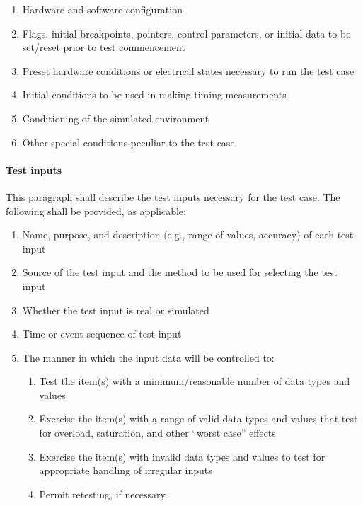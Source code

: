 \begin{enumerate}
\itemsep1pt\parskip0pt
\item
  Hardware and software configuration
\item
  Flags, initial breakpoints, pointers, control parameters, or initial
  data to be set/reset prior to test commencement
\item
  Preset hardware conditions or electrical states necessary to run the
  test case
\item
  Initial conditions to be used in making timing measurements
\item
  Conditioning of the simulated environment
\item
  Other special conditions peculiar to the test case
\end{enumerate}

\paragraph{Test inputs}

This paragraph shall describe the test inputs necessary for the test
case. The following shall be provided, as applicable:

\begin{enumerate}
\itemsep1pt\parskip0pt
\item
  Name, purpose, and description (e.g., range of values, accuracy) of
  each test input
\item
  Source of the test input and the method to be used for selecting the
  test input
\item
  Whether the test input is real or simulated
\item
  Time or event sequence of test input
\item
  The manner in which the input data will be controlled to:

  \begin{enumerate}
  \itemsep1pt\parskip0pt
  \item
    Test the item(s) with a minimum/reasonable number of data types and
    values
  \item
    Exercise the item(s) with a range of valid data types and values
    that test for overload, saturation, and other ``worst case'' effects
  \item
    Exercise the item(s) with invalid data types and values to test for
    appropriate handling of irregular inputs
  \item
    Permit retesting, if necessary
  \end{enumerate}
\end{enumerate}


